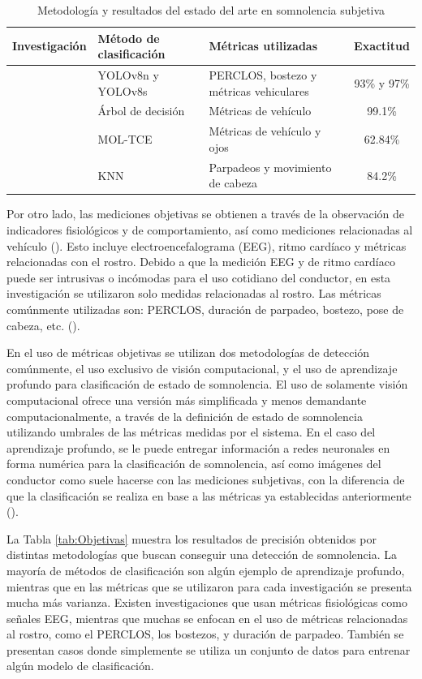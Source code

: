 \begin{table}[h!]
    \centering
    \footnotesize
    \renewcommand{\arraystretch}{1.8} 
    \begin{tabularx}{\textwidth}{c X X c}
        Investigación & Método de clasificación & Métricas utilizadas & Exactitud \\
        \hline
        \cite{Yolo} & YOLOv8n y YOLOv8s  & PERCLOS, bostezo y métricas vehiculares & 93\% y 97\% \\
        \cite{Sub_DT} & Árbol de decisión & Métricas de vehículo & 99.1\% \\ 
        \cite{Sub_MOL} & MOL-TCE & Métricas de vehículo y ojos & 62.84\% \\ 
        \cite{Sub_KNN} & KNN  & Parpadeos y movimiento de cabeza & 84.2\% \\
        \hline
    \end{tabularx}
    \caption{Metodología y resultados del estado del arte en somnolencia subjetiva}
    \label{tab:subjetivas}
\end{table}

Por otro lado, las mediciones objetivas se obtienen a través de la observación de indicadores fisiológicos y de comportamiento, así como mediciones relacionadas al vehículo (\cite{osamaSubyObj}). Esto incluye electroencefalograma (EEG), ritmo cardíaco y métricas relacionadas con el rostro. Debido a que la medición EEG y de ritmo cardíaco puede ser intrusivas o incómodas para el uso cotidiano del conductor, en esta investigación se utilizaron solo medidas relacionadas al rostro. Las métricas comúnmente utilizadas son: PERCLOS, duración de parpadeo, bostezo, pose de cabeza, etc. (\cite{sysrev}). 

En el uso de métricas objetivas se utilizan dos metodologías de detección comúnmente, el uso exclusivo de visión computacional, y el uso de aprendizaje profundo para clasificación de estado de somnolencia. El uso de solamente visión computacional ofrece una versión más simplificada y menos demandante computacionalmente, a través de la definición de estado de somnolencia utilizando umbrales de las métricas medidas por el sistema. En el caso del aprendizaje profundo, se le puede entregar información a redes neuronales en forma numérica para la clasificación de somnolencia, así como imágenes del conductor como suele hacerse con las mediciones subjetivas, con la diferencia de que la clasificación se realiza en base a las métricas ya establecidas anteriormente (\cite{sysrev}).

La Tabla \ref{tab:Objetivas} muestra los resultados de precisión obtenidos por distintas metodologías que buscan conseguir una detección de somnolencia. La mayoría de métodos de clasificación son algún ejemplo de aprendizaje profundo, mientras que en las métricas que se utilizaron para cada investigación se presenta mucha más varianza. Existen investigaciones que usan métricas fisiológicas como señales EEG, mientras que muchas se enfocan en el uso de métricas relacionadas al rostro, como el PERCLOS, los bostezos, y duración de parpadeo. También se presentan casos donde simplemente se utiliza un conjunto de datos para entrenar algún modelo de clasificación.

